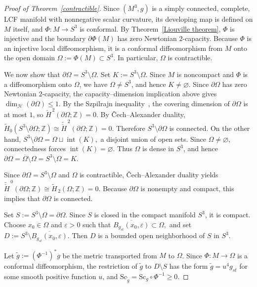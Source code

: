 \documentclass[12pt,oneside,a4paper]{article}
\theoremstyle{mytheorem}
\theoremstyle{remark}
\theoremstyle{definition}
\begin{document}
\begin{proof}[Proof of Theorem~\ref{contractible}]
Since \( (M^3, g) \) is a simply connected, complete, LCF manifold with nonnegative scalar curvature, its developing map is defined on \( M \) itself, and
$\Phi\colon M\to S^3$ is conformal. By Theorem~\ref{Liouville theorem}, \(\Phi\) is injective and the boundary \(\partial\Phi(M)\) has zero Newtonian \(2\)-capacity.
Because \(\Phi\) is an injective local diffeomorphism, it is a conformal
diffeomorphism from \(M\) onto the open domain
\(\Omega:=\Phi(M)\subset S^3\). In particular, \(\Omega\) is contractible.

We now show that \( \partial \Omega = S^3 \setminus \Omega \).
Set \(K:=S^3\setminus\Omega\). Since \(M\) is noncompact and \(\Phi\) is a diffeomorphism onto \(\Omega\), we have \(\Omega\neq S^3\), and hence \(K\neq\varnothing\). Since \(\partial\Omega\) has zero Newtonian \(2\)-capacity, the capacity--dimension implication above gives
$\dim_{\mathcal H}(\partial\Omega)\le 1.$
By the Szpilrajn inequality~\cite[Chapter~VII]{MR0006493}, the
covering dimension of \(\partial\Omega\) is at most \(1\), so
$\check H^{\,2}(\partial\Omega;\mathbb Z)=0.$
By \v{C}ech--Alexander duality,
\(\widetilde H_0(S^3\setminus \partial\Omega;\mathbb Z)
\cong
\widetilde{\check H}^{\,2}(\partial\Omega;\mathbb Z)=0\).
Therefore \(S^3\setminus \partial\Omega\) is connected. On the other hand,
$S^3\setminus \partial\Omega=\Omega\sqcup \operatorname{int}(K),$
a disjoint union of open sets. Since \(\Omega\neq\varnothing\), connectedness forces
$\operatorname{int}(K)=\varnothing.$
Thus \(\Omega\) is dense in \(S^3\), and hence
\(\partial\Omega=\overline{\Omega}\setminus\Omega=S^3\setminus\Omega=K.\)

Since \(\partial\Omega=S^3\setminus\Omega\) and \(\Omega\) is contractible,
\v{C}ech--Alexander duality yields
\(\widetilde{\check H}^{\,0}(\partial\Omega;\mathbb Z)
\cong
\widetilde H_{\,2}(\Omega;\mathbb Z)=0\).
Because \(\partial\Omega\) is nonempty and compact, this implies that
\(\partial\Omega\) is connected.

Set \(S:=S^3\setminus\Omega=\partial\Omega\). Since \(S\) is closed in the
compact manifold \(S^3\), it is compact. Choose \(x_0\in\Omega\) and
\(\varepsilon>0\) such that
\(\overline{B_{g_{st}}(x_0,\varepsilon)}\subset\Omega,\) and set
\(D:=S^3\setminus\overline{B_{g_{st}}(x_0,\varepsilon)}.\)
Then \(D\) is a bounded open neighborhood of \(S\) in \(S^3\).

Let \(\tilde g:=(\Phi^{-1})^*g\) be the metric transported from \(M\) to
\(\Omega\). Since \(\Phi\colon M\to\Omega\) is a conformal diffeomorphism,
the restriction of \(\tilde g\) to \(D\setminus S\) has the
form \(\tilde g=u^4g_{st}\) for some smooth positive function \(u\), and
\(\mathrm{Sc}_{\tilde g}=\mathrm{Sc}_g\circ\Phi^{-1}\geq0.\)


\end{proof}
\end{document}
